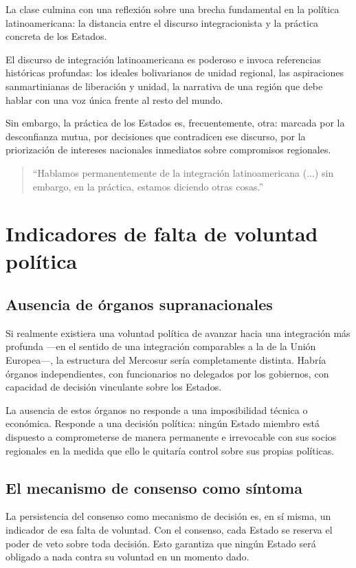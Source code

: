 \documentclass[12pt,oneside]{book}
\begin{document}
La clase culmina con una reflexión sobre una brecha fundamental en la política latinoamericana: la distancia entre el discurso integracionista y la práctica concreta de los Estados.

El discurso de integración latinoamericana es poderoso e invoca referencias históricas profundas: los ideales bolivarianos de unidad regional, las aspiraciones sanmartinianas de liberación y unidad, la narrativa de una región que debe hablar con una voz única frente al resto del mundo.

Sin embargo, la práctica de los Estados es, frecuentemente, otra: marcada por la desconfianza mutua, por decisiones que contradicen ese discurso, por la priorización de intereses nacionales inmediatos sobre compromisos regionales.

\begin{quote}
``Hablamos permanentemente de la integración latinoamericana (...) sin embargo, en la práctica, estamos diciendo otras cosas.''
\end{quote}

\section{Indicadores de falta de voluntad política}

\subsection{Ausencia de órganos supranacionales}

Si realmente existiera una voluntad política de avanzar hacia una integración más profunda ---en el sentido de una integración comparables a la de la Unión Europea---, la estructura del Mercosur sería completamente distinta. Habría órganos independientes, con funcionarios no delegados por los gobiernos, con capacidad de decisión vinculante sobre los Estados.

La ausencia de estos órganos no responde a una imposibilidad técnica o económica. Responde a una decisión política: ningún Estado miembro está dispuesto a comprometerse de manera permanente e irrevocable con sus socios regionales en la medida que ello le quitaría control sobre sus propias políticas.

\subsection{El mecanismo de consenso como síntoma}

La persistencia del consenso como mecanismo de decisión es, en sí misma, un indicador de esa falta de voluntad. Con el consenso, cada Estado se reserva el poder de veto sobre toda decisión. Esto garantiza que ningún Estado será obligado a nada contra su voluntad en un momento dado.
\end{document}

